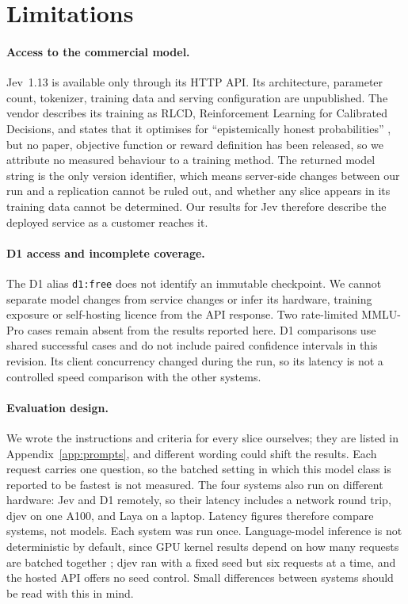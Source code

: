 \section{Limitations}
\label{sec:limitations}

\paragraph{Access to the commercial model.} Jev~1.13 is available only through
its HTTP API. Its architecture, parameter count, tokenizer, training data and
serving configuration are unpublished. The vendor describes its training as
RLCD, Reinforcement Learning for Calibrated Decisions, and states that it
optimises for ``epistemically honest probabilities'' \citep{typesafe2026jev},
but no paper, objective function or reward definition has been released, so we
attribute no measured behaviour to a training method. The returned model string
is the only version identifier, which means server-side changes between our run
and a replication cannot be ruled out, and whether any slice appears in its
training data cannot be determined. Our results for Jev therefore describe the
deployed service as a customer reaches it.

\paragraph{D1 access and incomplete coverage.} The D1 alias \texttt{d1:free}
does not identify an immutable checkpoint. We cannot separate model changes
from service changes or infer its hardware, training exposure or self-hosting
licence from the API response. Two rate-limited MMLU-Pro cases remain absent
from the results reported here. D1 comparisons use shared successful cases and
do not include paired confidence intervals in this revision. Its client
concurrency changed during the run, so its latency is not a controlled speed
comparison with the other systems.

\paragraph{Evaluation design.} We wrote the instructions and criteria for every
slice ourselves; they are listed in Appendix~\ref{app:prompts}, and different
wording could shift the results. Each request carries one question, so the
batched setting in which this model class is reported to be fastest is not
measured. The four systems also run on different hardware: Jev and D1 remotely, so their
latency includes a network round trip, djev on one A100, and Laya on a laptop.
Latency figures therefore compare systems, not models. Each system was run once.
Language-model inference is not deterministic by default, since GPU kernel
results depend on how many requests are batched together
\citep{he2025nondeterminism}; djev ran with a fixed seed but six requests at a
time, and the hosted API offers no seed control. Small differences between
systems should be read with this in mind.

